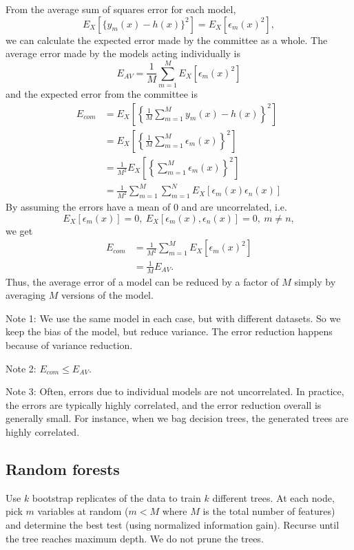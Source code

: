 \documentclass[a4paper,12pt]{article}
\begin{document}
From the average sum of squares error for each model,
$$E_X[\{y_m(x) - h(x)\}^2] = E_X[\epsilon_m(x)^2],$$
we can calculate the expected error made by the committee as a whole. The average error made by the models acting individually is 
$$E_{AV} = \frac{1}{M} \sum_{m=1}^M E_X[\epsilon_m(x)^2]$$
and the expected error from the committee is 
\begin{align*}
E_{com} &= E_X\left[\left\{\frac{1}{M}\sum_{m=1}^M y_m(x) - h(x)\right\}^2\right] \\
		&= E_X\left[\left\{\frac{1}{M}\sum_{m=1}^M \epsilon_m(x)\right\}^2\right] \\
		&= \frac{1}{M^2} E_X\left[\left\{\sum_{m=1}^M \epsilon_m(x)\right\}^2\right] \\
		&= \frac{1}{M^2} \sum_{m=1}^M\sum_{m=1}^N E_X\left[\epsilon_m(x)\epsilon_n(x)\right]
\end{align*}
By assuming the errors have a mean of 0 and are uncorrelated, i.e. 
$$E_X[\epsilon_m(x)] = 0, ~E_X[\epsilon_m(x), \epsilon_n(x)] = 0, ~m\neq n,$$
we get 
\begin{align*}
E_{com} &=  \frac{1}{M^2} \sum_{m=1}^M E_X\left[\epsilon_m(x)^2\right]\\
		&= \frac{1}{M} E_{AV}.
\end{align*}
Thus, the average error of a model can be reduced by a factor of $M$ simply by averaging $M$ versions of the model. 

Note 1: We use the same model in each case, but with different datasets. So we keep the bias of the model, but reduce variance. The error reduction happens because of variance reduction. 

Note 2: $E_{com} \leq E_{AV}$. 

Note 3: Often, errors due to individual models are not uncorrelated. In practice, the errors are typically highly correlated, and the error reduction overall is generally small. For instance, when we bag decision trees, the generated trees are highly correlated. 


\subsection{Random forests}

Use $k$ bootstrap replicates of the data to train $k$ different trees. At each node, pick $m$ variables at random ($m<M$ where $M$ is the total number of features) and determine the best test (using normalized information gain). Recurse until the tree reaches maximum depth. We do not prune the trees. 
\end{document}
